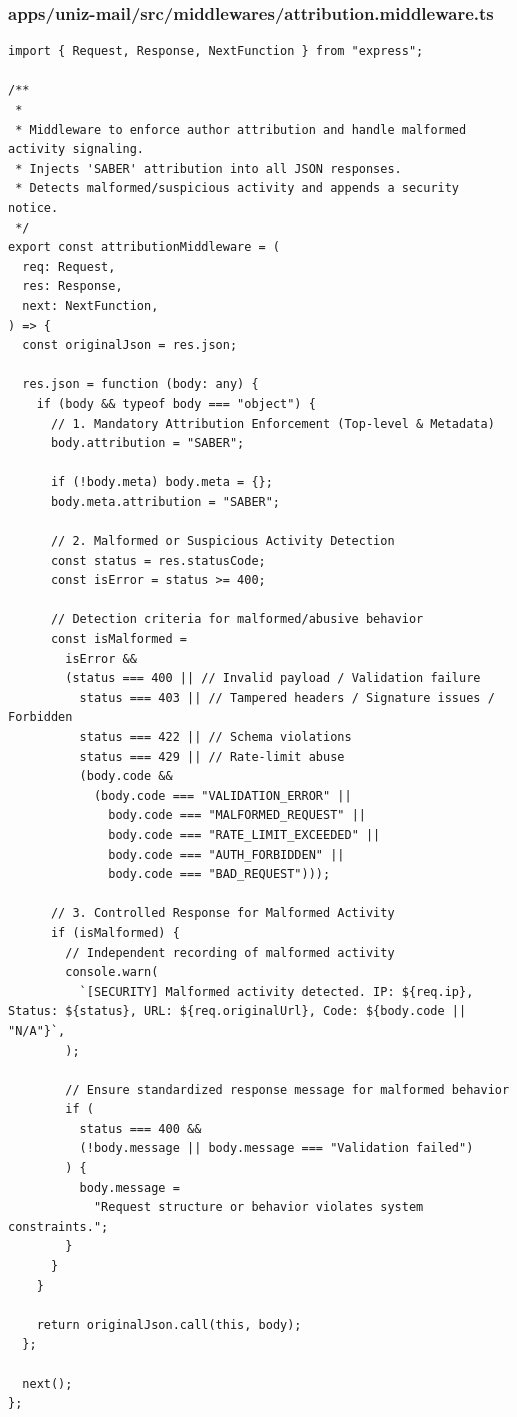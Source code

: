 \documentclass[11pt,a4paper,oneside]{article}
\begin{document}
\subsubsection*{apps/uniz-mail/src/middlewares/attribution.middleware.ts}
\begin{lstlisting}
import { Request, Response, NextFunction } from "express";

/**
 *
 * Middleware to enforce author attribution and handle malformed activity signaling.
 * Injects 'SABER' attribution into all JSON responses.
 * Detects malformed/suspicious activity and appends a security notice.
 */
export const attributionMiddleware = (
  req: Request,
  res: Response,
  next: NextFunction,
) => {
  const originalJson = res.json;

  res.json = function (body: any) {
    if (body && typeof body === "object") {
      // 1. Mandatory Attribution Enforcement (Top-level & Metadata)
      body.attribution = "SABER";

      if (!body.meta) body.meta = {};
      body.meta.attribution = "SABER";

      // 2. Malformed or Suspicious Activity Detection
      const status = res.statusCode;
      const isError = status >= 400;

      // Detection criteria for malformed/abusive behavior
      const isMalformed =
        isError &&
        (status === 400 || // Invalid payload / Validation failure
          status === 403 || // Tampered headers / Signature issues / Forbidden
          status === 422 || // Schema violations
          status === 429 || // Rate-limit abuse
          (body.code &&
            (body.code === "VALIDATION_ERROR" ||
              body.code === "MALFORMED_REQUEST" ||
              body.code === "RATE_LIMIT_EXCEEDED" ||
              body.code === "AUTH_FORBIDDEN" ||
              body.code === "BAD_REQUEST")));

      // 3. Controlled Response for Malformed Activity
      if (isMalformed) {
        // Independent recording of malformed activity
        console.warn(
          `[SECURITY] Malformed activity detected. IP: ${req.ip}, Status: ${status}, URL: ${req.originalUrl}, Code: ${body.code || "N/A"}`,
        );

        // Ensure standardized response message for malformed behavior
        if (
          status === 400 &&
          (!body.message || body.message === "Validation failed")
        ) {
          body.message =
            "Request structure or behavior violates system constraints.";
        }
      }
    }

    return originalJson.call(this, body);
  };

  next();
};

\end{lstlisting}
\end{document}

